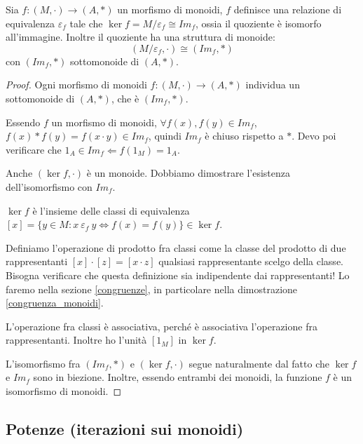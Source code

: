 \begin{prop}
Sia $f : (M, \cdot) \to (A, \ast)$ un morfismo di monoidi, $f$ definisce una relazione di equivalenza $\varepsilon_f$ tale che $\ker f = M / \varepsilon_f \cong Im_f$, ossia il quoziente \`e isomorfo all'immagine. Inoltre il quoziente ha una struttura di monoide:
\[
(M / \varepsilon_f , \cdot) \cong (Im_f, \ast)
\]
con $(Im_f, \ast)$ sottomonoide di $(A, \ast)$.
\end{prop}
\begin{proof}
Ogni morfismo di monoidi $f : (M, \cdot) \to (A, \ast)$ individua un sottomonoide di $(A, \ast)$, che \`e $(Im_f, \ast)$. 

Essendo $f$ un morfismo di monoidi, $\forall f(x), f(y) \in Im_f$, $f(x) \ast f(y) = f(x \cdot y) \in Im_f$, quindi $Im_f $ \`e chiuso rispetto a $\ast$. Devo poi verificare che $1_A \in Im_f \Leftarrow f(1_M) = 1_A$.

Anche $(\ker f, \cdot)$ \`e un monoide. Dobbiamo dimostrare l'esistenza dell'isomorfismo con $Im_f$.

$\ker f$ \`e l'insieme delle classi di equivalenza $[x] = \{ y \in M : x \ \varepsilon_f \ y \iff f(x) = f(y) \} \in \ker f$.

Definiamo l'operazione di prodotto fra classi come la classe del prodotto di due rappresentanti $[x] \cdot [z] = [x \cdot z]$ qualsiasi rappresentante scelgo della classe. Bisogna verificare che questa definizione sia indipendente dai rappresentanti! Lo faremo nella sezione \ref{congruenze}, in particolare nella dimostrazione \ref{congruenza_monoidi}. %

L'operazione fra classi \`e associativa, perch\'e \`e associativa l'operazione fra rappresentanti. Inoltre ho l'unit\`a $[1_M]$ in $\ker f$.

L'isomorfismo fra $(Im_f, \ast)$ e $(\ker f, \cdot)$ segue naturalmente dal fatto che $\ker f $ e $Im_f$ sono in biezione. Inoltre, essendo entrambi dei monoidi, la funzione $f$ \`e un isomorfismo di monoidi.
\end{proof}

\subsection{Potenze (iterazioni sui monoidi)}


